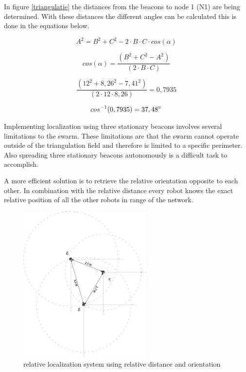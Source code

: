 \documentclass[10pt,a4paper]{article}
\begin{document}
In figure \ref{triangulatie} the distances from the beacons to node 1 (N1) are being determined. With these distances the different angles can be calculated this is done in the equations below.

\begin{equation}
A^2 = B^2 + C^2 - 2\cdot B\cdot C\cdot cos(\alpha)
\end{equation}

\begin{equation}
\label{eq:hoek}
cos(\alpha) = \frac{(B^2 + C^2 - A^2)}{(2\cdot B\cdot C)}
\end{equation}

\begin{equation}
\label{eq:hoek}
\frac{(12^2 + 8,26^2 - 7,41^2)}{(2\cdot12\cdot8,26)} = 0,7935
\end{equation}

\begin{equation}
cos^{-1}(0,7935) = 37,48\degree
\end{equation}

Implementing localization using three stationary beacons involves several limitations to the swarm. These limitations are that the swarm cannot operate outside of the triangulation field and therefore is limited to a specific perimeter. Also spreading three stationary beacons autonomously is a difficult task to accomplish.  

A more efficient solution is to retrieve the relative orientation opposite to each other. In combination with the relative distance every robot knows the exact relative position of all the other robots in range of the network.

\begin{figure}[H]
\centering
\includegraphics[angle=90, width=0.6\textwidth]{orientation.pdf}
\caption{relative localization system using relative distance and orientation}
\label{orientation}
\end{figure}
\end{document}
